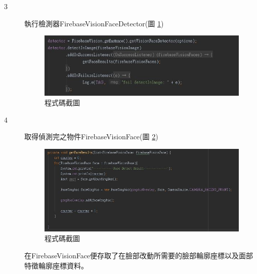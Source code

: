\documentclass[12pt]{article}  %
\theoremstyle{plain}
\begin{document}
\begin{itemize}
\begin{description}
\item[3] 執行檢測器FirebaseVisionFaceDetector(圖 \ref{detector})
\begin{figure}[htbp]
\centering
\includegraphics[width=13cm]{pic/ch3/detector.JPG}
\caption{程式碼截圖} \label{detector}
\end{figure}

\item[4] 取得偵測完之物件FirebaseVisionFace(圖 \ref{FaceResult})
\begin{figure}[htbp]
\centering
\includegraphics[width=13cm]{pic/ch3/FaceResult.JPG}
\caption{程式碼截圖} \label{FaceResult}
\end{figure}
在FirebaseVisionFace便存取了在臉部改動所需要的臉部輪廓座標以及面部特徵輪廓座標資料。
\end{description}
\end{itemize}
\end{document}

